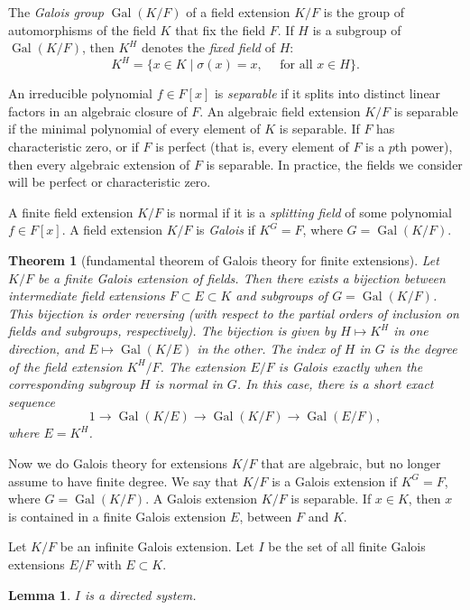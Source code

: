 \documentclass{amsart}
\def\op#1{{\operatorname{#1}}}
\newtheorem{theorem}[equation]{Theorem}
\newtheorem{lemma}[equation]{Lemma}
\def\newterm#1{{\it #1}}
\begin{document}
The \newterm{Galois group} $\op{Gal}(K/F)$
of a field extension $K/F$ is the group of automorphisms
of the field $K$ that fix the field $F$.   If $H$ is a subgroup of
$\op{Gal}(K/F)$, then $K^H$ denotes the \newterm{fixed field} of $H$:
\[
K^H= \{x \in K \mid \sigma(x) = x,\quad \text{ for all } x\in H\}.
\]


An irreducible polynomial $f\in F[x]$ is \newterm{separable} if it splits
into distinct linear factors in an algebraic closure of $F$.
An algebraic field extension $K/F$ is separable if the minimal polynomial
of every element of $K$ is separable.  If $F$ has characteristic zero, or
if $F$ is perfect (that is, every element of $F$ is a $p$th power), then
every algebraic extension of $F$ is separable.  In practice, the fields
we consider will be perfect or characteristic zero.

A finite field extension $K/F$ is normal if it is a \newterm{splitting field} of
some polynomial $f\in F[x]$.
A field extension $K/F$ is \newterm{Galois} if $K^G = F$, where $G=\op{Gal}(K/F)$.

\begin{theorem}[fundamental theorem of Galois theory for finite extensions]  
Let $K/F$ be a finite Galois extension of fields.
Then there exists a bijection between intermediate field extensions
$F\subset E\subset K$ and subgroups of $G=\op{Gal}(K/F)$.  This bijection
is order reversing (with respect to the partial orders of inclusion
on fields and subgroups, respectively).  The bijection is given by
$H\mapsto K^H$ in one direction, and $E\mapsto \op{Gal}(K/E)$ in the
other.   The index of $H$ in $G$ is the degree of the field extension $K^H/F$.
The extension $E/F$ is Galois exactly when the corresponding
subgroup $H$ is normal in $G$.  In this case, there is a short exact sequence
\[
1 \to \op{Gal}(K/E) \to \op{Gal}(K/F) \to \op{Gal}(E/F),
\]
where $E=K^H$.
\end{theorem}

Now we do Galois theory for extensions $K/F$ that are algebraic, but no longer
assume to have finite degree.  We say that $K/F$ is a Galois extension if
$K^G = F$, where $G=\op{Gal}(K/F)$.  A Galois extension $K/F$ is separable.
If $x\in K$, then $x$ is contained in a finite Galois extension $E$, between $F$ and $K$.

Let $K/F$ be an infinite Galois extension.  Let $I$ be the set of all finite
Galois extensions $E/F$ with $E\subset K$.

\begin{lemma} $I$ is a directed system.  
\end{lemma}
\end{document}
